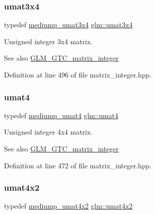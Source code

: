 \subsubsection{\texorpdfstring{umat3x4}{umat3x4}}
{\footnotesize\ttfamily typedef \hyperlink{group__gtc__matrix__integer_ga8113e067e1f327fac64cf9015c8c5431}{mediump\+\_\+umat3x4} \hyperlink{group__gtc__matrix__integer_ga5410857d098a989a30b4017100bc2ff7}{glm\+::umat3x4}}

Unsigned integer 3x4 matrix. \begin{DoxySeeAlso}{See also}
\hyperlink{group__gtc__matrix__integer}{G\+L\+M\+\_\+\+G\+T\+C\+\_\+matrix\+\_\+integer} 
\end{DoxySeeAlso}


Definition at line 496 of file matrix\+\_\+integer.\+hpp.

\mbox{\label{group__gtc__matrix__integer_ga7ae562000d8a8d193e9f93cf51e2e113}} 
\subsubsection{\texorpdfstring{umat4}{umat4}}
{\footnotesize\ttfamily typedef \hyperlink{group__gtc__matrix__integer_gac82f1c426fbca1c4989f0985eb7a4358}{mediump\+\_\+umat4} \hyperlink{group__gtc__matrix__integer_ga7ae562000d8a8d193e9f93cf51e2e113}{glm\+::umat4}}

Unsigned integer 4x4 matrix. \begin{DoxySeeAlso}{See also}
\hyperlink{group__gtc__matrix__integer}{G\+L\+M\+\_\+\+G\+T\+C\+\_\+matrix\+\_\+integer} 
\end{DoxySeeAlso}


Definition at line 472 of file matrix\+\_\+integer.\+hpp.

\mbox{\label{group__gtc__matrix__integer_ga13e8392218e9b6e1b7f194a21b5c88bf}} 
\subsubsection{\texorpdfstring{umat4x2}{umat4x2}}
{\footnotesize\ttfamily typedef \hyperlink{group__gtc__matrix__integer_ga8ea45737e8bc9bfae2668968056b109f}{mediump\+\_\+umat4x2} \hyperlink{group__gtc__matrix__integer_ga13e8392218e9b6e1b7f194a21b5c88bf}{glm\+::umat4x2}}

